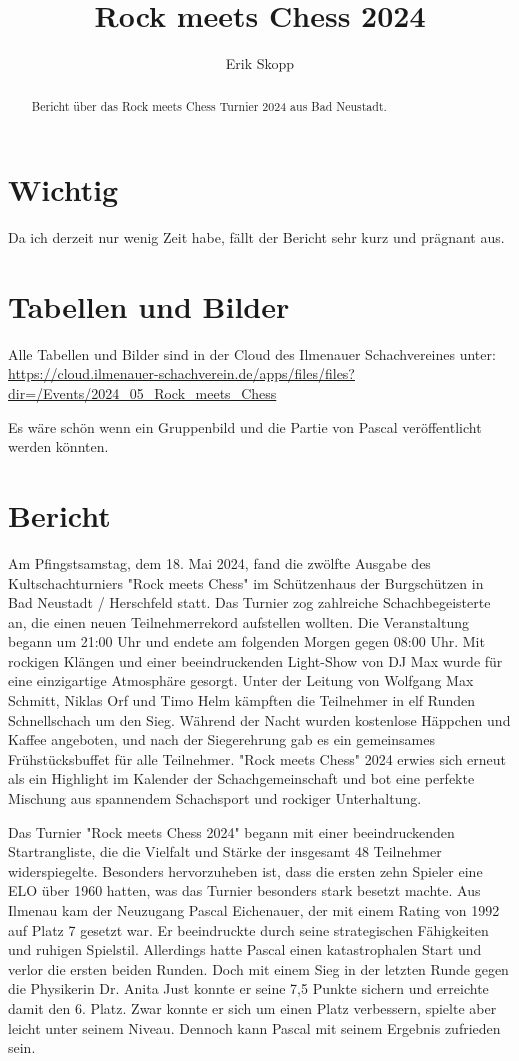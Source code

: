 \documentclass[a4paper,ngerman]{tui-algo-seminar}
\title{Rock meets Chess 2024}
\author{Erik Skopp}
\begin{document}
\maketitle

\begin{abstract}
Bericht über das Rock meets Chess Turnier 2024 aus Bad Neustadt.
\end{abstract}

\section{Wichtig}
Da ich derzeit nur wenig Zeit habe, fällt der Bericht sehr kurz und prägnant aus.

\section{Tabellen und Bilder}
Alle Tabellen und Bilder sind in der Cloud des Ilmenauer Schachvereines unter: \url{https://cloud.ilmenauer-schachverein.de/apps/files/files?dir=/Events/2024_05_Rock_meets_Chess}

Es wäre schön wenn ein Gruppenbild und die Partie von Pascal veröffentlicht werden könnten. 

\clearpage

\section{Bericht}
Am Pfingstsamstag, dem 18. Mai 2024, fand die zwölfte Ausgabe des Kultschachturniers "Rock meets Chess" im Schützenhaus der Burgschützen in Bad Neustadt / Herschfeld statt. Das Turnier zog zahlreiche Schachbegeisterte an, die einen neuen Teilnehmerrekord aufstellen wollten. Die Veranstaltung begann um 21:00 Uhr und endete am folgenden Morgen gegen 08:00 Uhr. Mit rockigen Klängen und einer beeindruckenden Light-Show von DJ Max wurde für eine einzigartige Atmosphäre gesorgt. Unter der Leitung von Wolfgang Max Schmitt, Niklas Orf und Timo Helm kämpften die Teilnehmer in elf Runden Schnellschach um den Sieg. Während der Nacht wurden kostenlose Häppchen und Kaffee angeboten, und nach der Siegerehrung gab es ein gemeinsames Frühstücksbuffet für alle Teilnehmer. "Rock meets Chess" 2024 erwies sich erneut als ein Highlight im Kalender der Schachgemeinschaft und bot eine perfekte Mischung aus spannendem Schachsport und rockiger Unterhaltung.

Das Turnier "Rock meets Chess 2024" begann mit einer beeindruckenden Startrangliste, die die Vielfalt und Stärke der insgesamt 48 Teilnehmer widerspiegelte. Besonders hervorzuheben ist, dass die ersten zehn Spieler eine ELO über 1960 hatten, was das Turnier besonders stark besetzt machte. Aus Ilmenau kam der Neuzugang Pascal Eichenauer, der mit einem Rating von 1992 auf Platz 7 gesetzt war. Er beeindruckte durch seine strategischen Fähigkeiten und ruhigen Spielstil. Allerdings hatte Pascal einen katastrophalen Start und verlor die ersten beiden Runden. Doch mit einem Sieg in der letzten Runde gegen die Physikerin Dr. Anita Just konnte er seine 7,5 Punkte sichern und erreichte damit den 6. Platz. Zwar konnte er sich um einen Platz verbessern, spielte aber leicht unter seinem Niveau. Dennoch kann Pascal mit seinem Ergebnis zufrieden sein.
\end{document}
